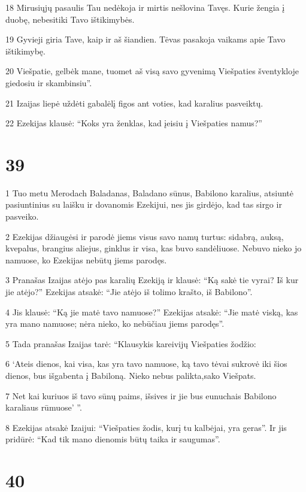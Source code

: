 \par 18 Mirusiųjų pasaulis Tau nedėkoja ir mirtis nešlovina Tavęs. Kurie žengia į duobę, nebesitiki Tavo ištikimybės. 
\par 19 Gyvieji giria Tave, kaip ir aš šiandien. Tėvas pasakoja vaikams apie Tavo ištikimybę. 
\par 20 Viešpatie, gelbėk mane, tuomet aš visą savo gyvenimą Viešpaties šventykloje giedosiu ir skambinsiu”. 
\par 21 Izaijas liepė uždėti gabalėlį figos ant voties, kad karalius pasveiktų. 
\par 22 Ezekijas klausė: “Koks yra ženklas, kad įeisiu į Viešpaties namus?”



\chapter{39}


\par 1 Tuo metu Merodach Baladanas, Baladano sūnus, Babilono karalius, atsiuntė pasiuntinius su laišku ir dovanomis Ezekijui, nes jis girdėjo, kad tas sirgo ir pasveiko. 
\par 2 Ezekijas džiaugėsi ir parodė jiems visus savo namų turtus: sidabrą, auksą, kvepalus, brangius aliejus, ginklus ir visa, kas buvo sandėliuose. Nebuvo nieko jo namuose, ko Ezekijas nebūtų jiems parodęs. 
\par 3 Pranašas Izaijas atėjo pas karalių Ezekiją ir klausė: “Ką sakė tie vyrai? Iš kur jie atėjo?” Ezekijas atsakė: “Jie atėjo iš tolimo krašto, iš Babilono”. 
\par 4 Jis klausė: “Ką jie matė tavo namuose?” Ezekijas atsakė: “Jie matė viską, kas yra mano namuose; nėra nieko, ko nebūčiau jiems parodęs”. 
\par 5 Tada pranašas Izaijas tarė: “Klausykis kareivijų Viešpaties žodžio: 
\par 6 ‘Ateis dienos, kai visa, kas yra tavo namuose, ką tavo tėvai sukrovė iki šios dienos, bus išgabenta į Babiloną. Nieko nebus palikta,­sako Viešpats.­ 
\par 7 Net kai kuriuos iš tavo sūnų paims, išsives ir jie bus eunuchais Babilono karaliaus rūmuose’ ”. 
\par 8 Ezekijas atsakė Izaijui: “Viešpaties žodis, kurį tu kalbėjai, yra geras”. Ir jis pridūrė: “Kad tik mano dienomis būtų taika ir saugumas”.



\chapter{40}


